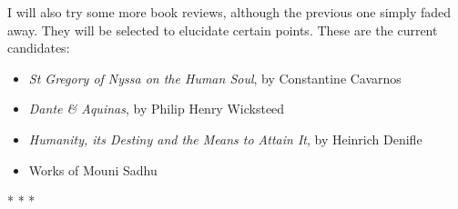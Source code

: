 I will also try some more book reviews, although the previous one simply faded away. They will be selected to elucidate certain points. These are the current candidates:

\begin{itemize}


\item \textit{St Gregory of Nyssa on the Human Soul}, by Constantine Cavarnos

\item \textit{Dante \& Aquinas}, by Philip Henry Wicksteed

\item \textit{Humanity, its Destiny and the Means to Attain It}, by Heinrich Denifle

\item Works of Mouni Sadhu
\end{itemize}




\begin{center}* * *\end{center}

